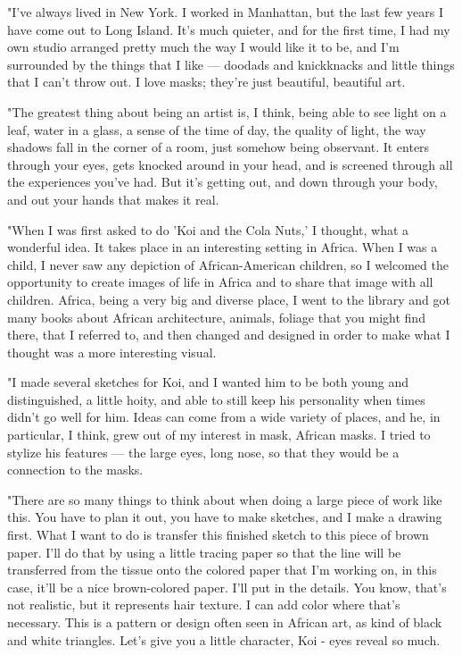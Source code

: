 "I've always lived in New York. I worked in Manhattan, but the last few years I have come out to Long Island. It's much quieter, and for the first time, I had my own studio arranged pretty much the way I would like it to be, and I'm surrounded by the things that I like — doodads and knickknacks and little things that I can't throw out. I love masks; they're just beautiful, beautiful art.

"The greatest thing about being an artist is, I think, being able to see light on a leaf, water in a glass, a sense of the time of day, the quality of light, the way shadows fall in the corner of a room, just somehow being observant. It enters through your eyes, gets knocked around in your head, and is screened through all the experiences you've had. But it's getting out, and down through your body, and out your hands that makes it real.

"When I was first asked to do 'Koi and the Cola Nuts,' I thought, what a wonderful idea. It takes place in an interesting setting in Africa. When I was a child, I never saw any depiction of African-American children, so I welcomed the opportunity to create images of life in Africa and to share that image with all children. Africa, being a very big and diverse place, I went to the library and got many books about African architecture, animals, foliage that you might find there, that I referred to, and then changed and designed in order to make what I thought was a more interesting visual.

"I made several sketches for Koi, and I wanted him to be both young and distinguished, a little hoity, and able to still keep his personality when times didn't go well for him. Ideas can come from a wide variety of places, and he, in particular, I think, grew out of my interest in mask, African masks. I tried to stylize his features — the large eyes, long nose, so that they would be a connection to the masks.

"There are so many things to think about when doing a large piece of work like this. You have to plan it out, you have to make sketches, and I make a drawing first. What I want to do is transfer this finished sketch to this piece of brown paper. I'll do that by using a little tracing paper so that the line will be transferred from the tissue onto the colored paper that I'm working on, in this case, it'll be a nice brown-colored paper. I'll put in the details. You know, that's not realistic, but it represents hair texture. I can add color where that's necessary. This is a pattern or design often seen in African art, as kind of black and white triangles. Let's give you a little character, Koi - eyes reveal so much.

